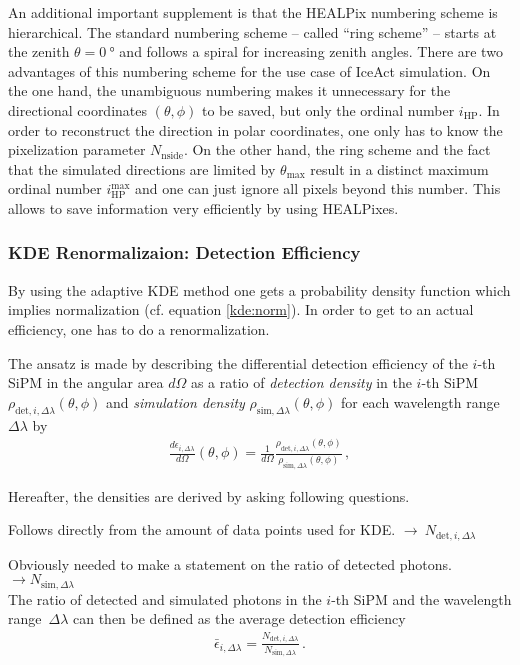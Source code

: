 An additional important supplement is that the HEALPix numbering scheme is hierarchical. The standard numbering scheme -- called \enquote{ring scheme} -- starts at the zenith $\theta = \SI{0}{\degree}$ and follows a spiral for increasing zenith angles. There are two advantages of this numbering scheme for the use case of IceAct simulation. On the one hand, the unambiguous numbering makes it unnecessary for the directional coordinates $(\theta, \phi)$ to be saved, but only the ordinal number $i_\text{HP}$. In order to reconstruct the direction in polar coordinates, one only has to know the pixelization parameter $N_\text{nside}$. On the other hand, the ring scheme and the fact that the simulated directions are limited by $\theta_\text{max}$ result in a distinct maximum ordinal number $i_\text{HP}^\text{max}$ and one can just ignore all pixels beyond this number. This allows to save information very efficiently by using HEALPixes. 

\subsubsection{KDE Renormalizaion: Detection Efficiency}

By using the adaptive KDE method one gets a probability density function which implies normalization (cf. equation \eqref{kde:norm}). In order to get to an actual efficiency, one has to do a renormalization.

The ansatz is made by describing the differential detection efficiency of the $i$-th SiPM in the angular area $d\Omega$ as a ratio of \textit{detection density} in the $i$-th SiPM $\rho_{\text{det},i,\Delta\lambda}(\theta,\phi)$ and \textit{simulation density} $\rho_{\text{sim},\Delta\lambda}(\theta,\phi)$ for each wavelength range $\Delta\lambda$ by
\begin{align}
\frac{d\epsilon_{i,\Delta\lambda}}{d\Omega}(\theta,\phi) = \frac{1}{d\Omega} \frac{\rho_{\text{det},i,\Delta\lambda}(\theta,\phi)}{\rho_{\text{sim},\Delta\lambda}(\theta,\phi)}\,,
\end{align}

Hereafter, the densities are derived by asking following questions.

Follows directly from the amount of data points used for KDE. $\rightarrow~N_{\text{det},i,\Delta\lambda}$

Obviously needed to make a statement on the ratio of detected photons. $\rightarrow N_{\text{sim},\Delta\lambda}$\\
The ratio of detected and simulated photons in the $i$-th SiPM and the wavelength range~$\Delta\lambda$ can then be defined as the average detection efficiency 
\begin{align}
	\bar{\epsilon}_{i,\Delta\lambda} = \frac{N_{\text{det},i,\Delta\lambda}}{N_{\text{sim},\Delta\lambda}}\,.
\end{align}

